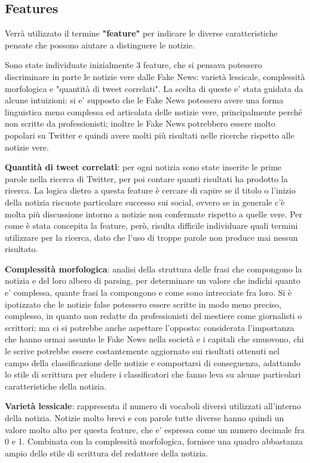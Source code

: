 \documentclass{article}
\begin{document}
\begin{multicols}{2}
	    \section{Features}
		    Verrà utilizzato il termine \textbf{"feature"} per indicare le diverse caratteristiche pensate che possono aiutare a distinguere le notizie.
		    
			Sono state individuate inizialmente 3 feature, che si pensava potessero discriminare in parte le notizie vere dalle Fake News: varietà lessicale, complessità morfologica e "quantità di tweet correlati". 
			La scelta di queste e' stata guidata da alcune intuizioni: si e' supposto che le Fake News potessero avere una forma linguistica meno complessa ed articolata delle notizie vere, principalmente perché non scritte da professionisti; inoltre le Fake News potrebbero essere molto popolari su Twitter e quindi avere molti più risultati nelle ricerche rispetto alle notizie vere.
					
			
			\textbf{Quantità di tweet correlati}: per ogni notizia sono state inserite le prime parole nella ricerca di Twitter, per poi contare quanti risultati ha prodotto la ricerca. La logica dietro a questa feature è cercare di capire se il titolo o l'inizio della notizia riscuote particolare successo sui social, ovvero se in generale c'è molta più discussione intorno a notizie non confermate rispetto a quelle vere. Per come è stata concepita la feature, però, risulta difficile individuare quali termini utilizzare per la ricerca, dato che l'uso di troppe parole non produce mai nessun risultato.
					
			\textbf{Complessità morfologica}: analisi della struttura delle frasi che compongono la notizia e del loro albero di parsing, per determinare un valore che indichi quanto e' complessa, quante frasi la compongono e come sono intrecciate fra loro.
			Si è ipotizzato che le notizie false potessero essere scritte in modo meno preciso, complesso, in quanto non redatte da professionisti del mestiere come giornalisti o scrittori; ma ci si potrebbe anche aspettare l'opposto: considerata l'importanza che hanno ormai assunto le Fake News nella società e i capitali che smuovono, chi le scrive potrebbe essere costantemente aggiornato sui risultati ottenuti nel campo della classificazione delle notizie e comportarsi di conseguenza, adattando lo stile di scrittura per eludere i classificatori che fanno leva su alcune particolari caratteristiche della notizia.
			
			\textbf{Varietà lessicale}: rappresenta il numero di vocaboli diversi utilizzati all'interno della notizia. Notizie molto brevi e con parole tutte diverse hanno quindi un valore molto alto per questa feature, che e' espressa come un numero decimale fra 0 e 1.
			Combinata con la complessità morfologica, fornisce una quadro abbastanza ampio dello stile di scrittura del redattore della notizia.


\end{multicols}
\end{document}

